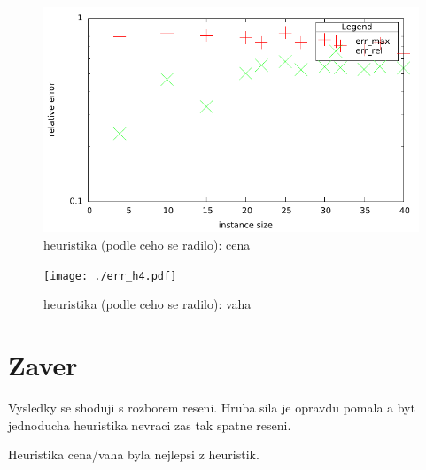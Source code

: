 \documentclass[12pt,a4paper]{article}
\begin{document}
\begin{figure}[H]
	\caption{heuristika (podle ceho se radilo): cena}
	\includegraphics{./err_h3.pdf}
\end{figure}

\begin{figure}[H]
	\caption{heuristika (podle ceho se radilo): vaha}
	\texttt{[image: ./err\_h4.pdf]}
\end{figure}

\section{Zaver}
Vysledky se shoduji s rozborem reseni. Hruba sila je opravdu pomala a byt jednoducha heuristika nevraci zas tak spatne reseni.

Heuristika cena/vaha byla nejlepsi z heuristik.
\end{document}
